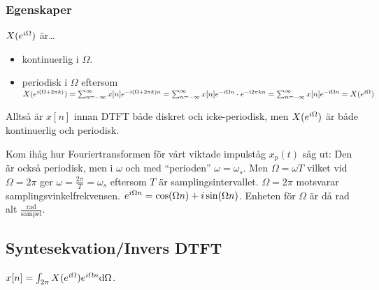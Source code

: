 \documentclass[a4paper]{article}
\begin{document}
\subsubsection{Egenskaper}
\(
    X(e^{i\Omega})
\) är\dots
\begin{itemize}
    \item kontinuerlig i \(
        \Omega
    \).

    \item periodisk i \(
        \Omega
    \) eftersom \(
        X(e^{i(\Omega + 2 \pi k)}) 
            = \sum_{n=-\infty}^\infty x[n] e^{-i(\Omega + 2 \pi k) n}
            = \sum_{n=-\infty}^\infty x[n] e^{-i\Omega n} \cdot e^{-i2\pi k n}
            = \sum_{n=-\infty}^\infty x[n] e^{-i\Omega n} 
            = X(e^{i\Omega})
    \) 
\end{itemize}

Alltså är \(
    x[n]
\) innan DTFT både diskret och icke-periodisk, men \(
    X(e^{i\Omega})
\) är både kontinuerlig och periodisk.

Kom ihåg hur Fouriertransformen för vårt viktade impulståg \(
    x_p(t)
\) såg ut: \f

Den är också periodisk, men i \(
    \omega
\) och med \enquote{perioden} \(
    \omega = \omega_s
\). Men \(
    \Omega = \omega T
\) vilket vid \(
    \Omega = 2 \pi 
\) ger \(
    \omega = \frac{2\pi}{T} = \omega_s
\) eftersom \(
    T
\) är samplingsintervallet. \(
    \Omega = 2\pi
\) motsvarar samplingsvinkelfrekvensen. \(
    e^{i\Omega n} = \cos(\Omega n) + i \sin(\Omega n)
\). Enheten för \(
    \Omega
\) är då \si{\radian} alt \(
    \frac{\si{\radian}}{\text{sampel}}
\). 

\subsection{Syntesekvation/Invers DTFT}
\(
    x[n] = \int_{2\pi} X(e^{i\Omega}) e^{i\Omega n} \dd \Omega
\).  
\end{document}
